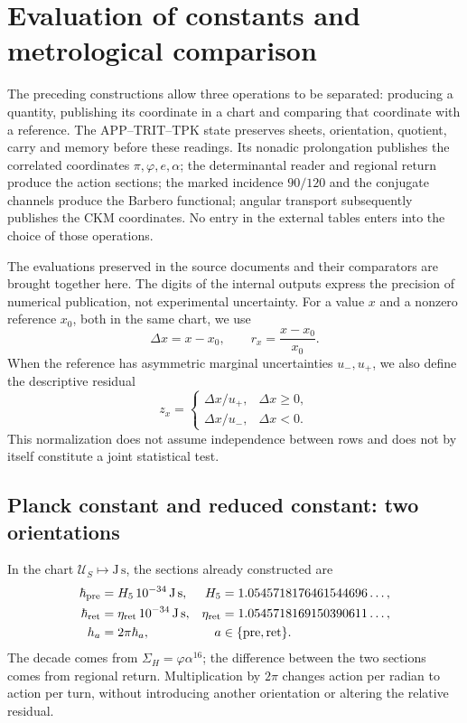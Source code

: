 \section{Evaluation of constants and metrological comparison}
\label{ii:sec:ii-contraste-cuantitativo}

The preceding constructions allow three operations to be separated:
producing a quantity, publishing its coordinate in a chart and comparing that
coordinate with a reference. The APP--TRIT--TPK state preserves sheets,
orientation, quotient, carry and memory before these readings. Its
nonadic prolongation publishes the correlated coordinates
\(\pi,\varphi,e,\alpha\); the determinantal reader and regional return
produce the action sections; the marked incidence \(90/120\) and
the conjugate channels produce the Barbero functional; angular
transport subsequently publishes the CKM coordinates. No entry in the external
tables enters into the choice of those operations.

The evaluations preserved in the source documents and their comparators
are brought together here. The digits of the internal outputs express the precision of
numerical publication, not experimental uncertainty. For a value
\(x\) and a nonzero reference \(x_0\), both in the same chart, we use
\[
 \Delta x=x-x_0,\qquad r_x=\frac{x-x_0}{x_0}.
\]
When the reference has asymmetric marginal uncertainties
\(u_-,u_+\), we also define the descriptive residual
\begin{equation}
 z_x=\begin{cases}
 \Delta x/u_+,&\Delta x\geq0,\\
 \Delta x/u_-,&\Delta x<0.
 \end{cases}
 \label{ii:eq:ii-residuo-marginal}
\end{equation}
This normalization does not assume independence between rows and does not
by itself constitute a joint statistical test.

\subsection{Planck constant and reduced constant: two orientations}

In the chart \(\mathcal U_S\mapsto\mathrm{J\,s}\), the sections already
constructed are
\begin{align}
 \hbar_{\rm pre}&=H_5\,10^{-34}\,\mathrm{J\,s},&
 H_5&=1.0545718176461544696\ldots,\\
 \hbar_{\rm ret}&=\eta_{\rm ret}\,10^{-34}\,\mathrm{J\,s},&
 \eta_{\rm ret}&=1.0545718169150390611\ldots,\\
 h_a&=2\pi\hbar_a,&a&\in\{\mathrm{pre},\mathrm{ret}\}.
 \label{ii:eq:ii-cuatro-coordenadas-planck}
\end{align}
The decade comes from \(\Sigma_H=\varphi\alpha^{16}\); the difference between
the two sections comes from regional return. Multiplication by \(2\pi\)
changes action per radian to action per turn, without introducing another
orientation or altering the relative residual.

